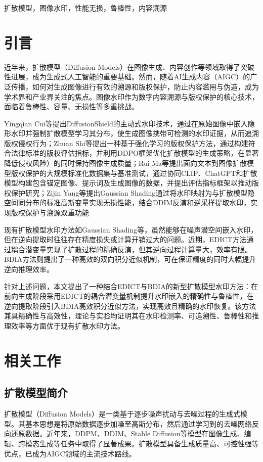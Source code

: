 \documentclass[conference]{IEEEtran}
\begin{document}
\begin{IEEEkeywords}
扩散模型，图像水印，性能无损，鲁棒性，内容溯源
\end{IEEEkeywords}

\section{引言}
近年来，扩散模型（Diffusion Models）在图像生成、内容创作等领域取得了突破性进展，成为生成式人工智能的重要基础。然而，随着AI生成内容（AIGC）的广泛传播，如何对生成图像进行有效的溯源和版权保护，防止内容滥用与伪造，成为学术界和产业界关注的焦点。图像水印作为数字内容溯源与版权保护的核心技术，面临着鲁棒性、容量、无损性等多重挑战。

Yingqian Cui\cite{cui2024diffusionshieldwatermarkcopyrightprotection}等提出DiffusionShield的主动式水印技术，通过在原始图像中嵌入隐形水印并强制扩散模型学习其分布，使生成图像携带可检测的水印证据，从而追溯版权侵权行为；Zhuan Shi\cite{shi2025rlcpreinforcementlearningbasedcopyright}等提出一种基于强化学习的版权保护方法，通过构建符合法律标准的版权评估指标，并利用DDPO框架优化扩散模型的生成策略，在显著降低侵权风险）的同时保持图像生成质量；Rui Ma\cite{ma2024dataset}等提出面向文本到图像扩散模型版权保护的大规模标准化数据集与基准测试，通过协同CLIP、ChatGPT和扩散模型构建包含锚定图像、提示词及生成图像的数据，并提出评估指标框架以推动版权保护研究；Zijin Yang\cite{Yang_2024_CVPR}等提出Gaussian Shading通过将水印映射为与扩散模型隐空间同分布的标准高斯变量实现无损性能，结合DDIM反演和逆采样提取水印，实现版权保护与溯源双重功能

现有扩散模型水印方法如Gaussian Shading等，虽然能够在噪声潜空间嵌入水印，但在逆向提取时往往存在精度损失或计算开销过大的问题。近期，EDICT\cite{panthi2025watermarkingdiffusionmodelgaussian}方法通过耦合潜变量实现了扩散过程的精确反演，但其逆向过程计算量大，效率有限。BDIA\cite{zhang2024exact}方法则提出了一种高效的双向积分近似机制，可在保证精度的同时大幅提升逆向推理效率。

针对上述问题，本文提出了一种结合EDICT与BDIA的新型扩散模型水印方法：在前向生成阶段采用EDICT的耦合潜变量机制提升水印嵌入的精确性与鲁棒性，在逆向提取阶段引入BDIA高效积分近似方法，实现高效且精确的水印恢复。该方法兼具精确性与高效性，理论与实验均证明其在水印检测率、可追溯性、鲁棒性和推理效率等方面优于现有扩散水印方法。

\section{相关工作}
\subsection{扩散模型简介}
扩散模型（Diffusion Models）\cite{WIJMANS19951}是一类基于逐步噪声扰动与去噪过程的生成式模型。其基本思想是将原始数据逐步加噪至高斯分布，然后通过学习到的去噪网络反向还原数据。近年来，DDPM、DDIM、Stable Diffusion等模型在图像生成、编辑、跨模态生成等任务中取得了显著成果。扩散模型具备生成质量高、可控性强等优点，已成为AIGC领域的主流技术路线。
\end{document}

